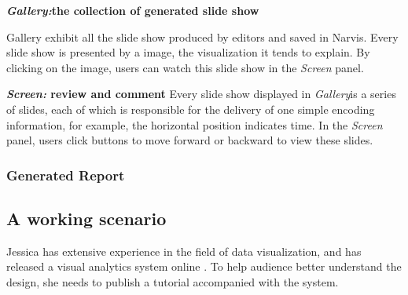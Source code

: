 \textbf{\textit{Gallery:}the collection of generated slide show}
 
Gallery exhibit all the slide show produced by editors and saved in Narvis. Every slide show is presented by a image, the visualization it tends to explain. By clicking on the image, users can watch this slide show in the \textit{Screen} panel. 

\textbf{\textit{Screen:}  review and comment}
Every slide show displayed in \textit{Gallery}is a series of slides, each of which is responsible for the delivery of one simple encoding information, for example, the horizontal position indicates time. In the \textit{Screen} panel, users click buttons to move forward or backward to view these slides. 
\subsubsection{Generated Report}

\subsection{A working scenario}
Jessica has extensive experience in the field of data visualization, and has released a visual analytics system online . To help audience better understand the design, she needs to publish a tutorial accompanied with the system.


